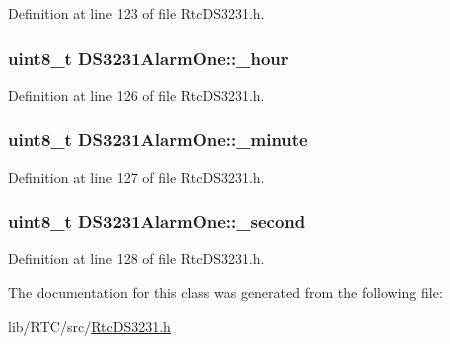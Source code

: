Definition at line 123 of file Rtc\+D\+S3231.\+h.

\subsubsection[{\texorpdfstring{\+\_\+hour}{_hour}}]{\setlength{\rightskip}{0pt plus 5cm}uint8\+\_\+t D\+S3231\+Alarm\+One\+::\+\_\+hour\hspace{0.3cm}{\ttfamily [protected]}}\hypertarget{class_d_s3231_alarm_one_abba9eb2586a5c3fae430cd6c6e928abf}{}\label{class_d_s3231_alarm_one_abba9eb2586a5c3fae430cd6c6e928abf}


Definition at line 126 of file Rtc\+D\+S3231.\+h.

\subsubsection[{\texorpdfstring{\+\_\+minute}{_minute}}]{\setlength{\rightskip}{0pt plus 5cm}uint8\+\_\+t D\+S3231\+Alarm\+One\+::\+\_\+minute\hspace{0.3cm}{\ttfamily [protected]}}\hypertarget{class_d_s3231_alarm_one_a834f5a766a7cc3622882cb0ec9c3c1a5}{}\label{class_d_s3231_alarm_one_a834f5a766a7cc3622882cb0ec9c3c1a5}


Definition at line 127 of file Rtc\+D\+S3231.\+h.

\subsubsection[{\texorpdfstring{\+\_\+second}{_second}}]{\setlength{\rightskip}{0pt plus 5cm}uint8\+\_\+t D\+S3231\+Alarm\+One\+::\+\_\+second\hspace{0.3cm}{\ttfamily [protected]}}\hypertarget{class_d_s3231_alarm_one_a80b36f162add194cf2036f4a17386910}{}\label{class_d_s3231_alarm_one_a80b36f162add194cf2036f4a17386910}


Definition at line 128 of file Rtc\+D\+S3231.\+h.



The documentation for this class was generated from the following file\+:\begin{DoxyCompactItemize}
\item 
lib/\+R\+T\+C/src/\hyperlink{_rtc_d_s3231_8h}{Rtc\+D\+S3231.\+h}\end{DoxyCompactItemize}
